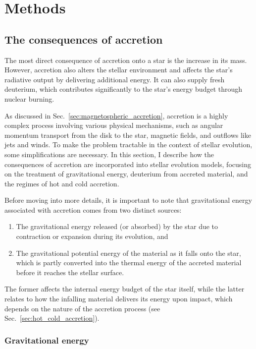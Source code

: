 \documentclass[12pt,a4paper]{article}
\begin{document}
\section{Methods}
\label{sec:methods}

\subsection{The consequences of accretion}
\label{sec:accretion_modeling}

The most direct consequence of accretion onto a star is the increase in its mass. However, accretion also alters the stellar environment and affects the star's radiative output by delivering additional energy. It can also supply fresh deuterium, which contributes significantly to the star's energy budget through nuclear burning.

As discussed in Sec.~\ref{sec:magnetospheric_accretion}, accretion is a highly complex process involving various physical mechanisms, such as angular momentum transport from the disk to the star, magnetic fields, and outflows like jets and winds. To make the problem tractable in the context of stellar evolution, some simplifications are necessary. In this section, I describe how the consequences of accretion are incorporated into stellar evolution models, focusing on the treatment of gravitational energy, deuterium from accreted material, and the regimes of hot and cold accretion.

Before moving into more details, it is important to note that gravitational energy associated with accretion comes from two distinct sources:
\begin{enumerate}
  \item The gravitational energy released (or absorbed) by the star due to contraction or expansion during its evolution, and
	\item The gravitational potential energy of the material as it falls onto the star, which is partly converted into the thermal energy of the accreted material before it reaches the stellar surface.
\end{enumerate}

The former affects the internal energy budget of the star itself, while the latter relates to how the infalling material delivers its energy upon impact, which depends on the nature of the accretion process (see Sec.~\ref{sec:hot_cold_accretion}).

\subsubsection{Gravitational energy}
\label{sec:grav_energy}
\end{document}
